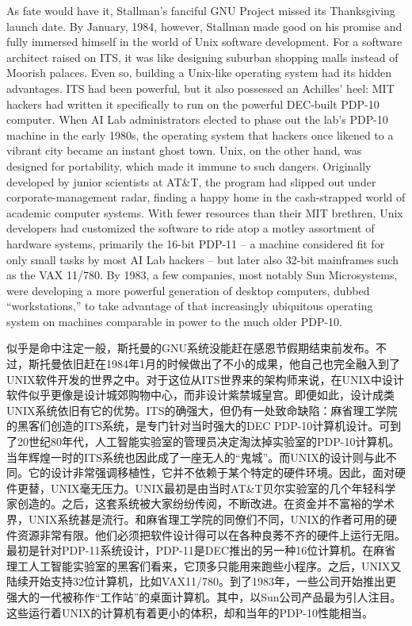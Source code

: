 As fate would have it, Stallman's fanciful GNU Project missed its Thanksgiving launch date. By January, 1984, however, Stallman made good on his promise and fully immersed himself in the world of Unix software development. For a software architect raised on ITS, it was like designing suburban shopping malls instead of Moorish palaces. Even so, building a Unix-like operating system had its hidden advantages. ITS had been powerful, but it also possessed an Achilles' heel: MIT hackers had written it specifically to run on the powerful DEC-built PDP-10 computer. When AI Lab administrators elected to phase out the lab's PDP-10 machine in the early 1980s, the operating system that hackers once likened to a vibrant city became an instant ghost town. Unix, on the other hand, was designed for portability, which made it immune to such dangers. Originally developed by junior scientists at AT\&T, the program had slipped out under corporate-management radar, finding a happy home in the cash-strapped world of academic computer systems. With fewer resources than their MIT brethren, Unix developers had customized the software to ride atop a motley assortment of hardware systems, primarily the 16-bit PDP-11 -- a machine considered fit for only small tasks by most AI Lab hackers -- but later also 32-bit mainframes such as the VAX 11/780. By 1983, a few companies, most notably Sun Microsystems, were developing a more powerful generation of desktop computers, dubbed ``workstations,'' to take advantage of that increasingly ubiquitous operating system on machines comparable in power to the much older PDP-10.
\fi
\fi

\ifdefined\chs
似乎是命中注定一般，斯托曼的GNU系统没能赶在感恩节假期结束前发布。不过，斯托曼依旧赶在1984年1月的时候做出了不小的成果，他自己也完全融入到了UNIX软件开发的世界之中。对于这位从ITS世界来的架构师来说，在UNIX中设计软件似乎更像是设计城郊购物中心，而非设计紫禁城皇宫。即便如此，设计成类UNIX系统依旧有它的优势。ITS的确强大，但仍有一处致命缺陷：麻省理工学院的黑客们创造的ITS系统，是专门针对当时强大的DEC PDP-10计算机设计。可到了20世纪80年代，人工智能实验室的管理员决定淘汰掉实验室的PDP-10计算机。当年辉煌一时的ITS系统也因此成了一座无人的``鬼城''。而UNIX的设计则与此不同。它的设计非常强调移植性，它并不依赖于某个特定的硬件环境。因此，面对硬件更替，UNIX毫无压力。UNIX最初是由当时AT\&T贝尔实验室的几个年轻科学家创造的。之后，这套系统被大家纷纷传阅，不断改进。在资金并不富裕的学术界，UNIX系统甚是流行。和麻省理工学院的同僚们不同，UNIX的作者可用的硬件资源非常有限。他们必须把软件设计得可以在各种良莠不齐的硬件上运行无阻。最初是针对PDP-11系统设计，PDP-11是DEC推出的另一种16位计算机。在麻省理工人工智能实验室的黑客们看来，它顶多只能用来跑些小程序。之后，UNIX又陆续开始支持32位计算机，比如VAX11/780。到了1983年，一些公司开始推出更强大的一代被称作``工作站''的桌面计算机。其中，以Sun公司产品最为引人注目。这些运行着UNIX的计算机有着更小的体积，却和当年的PDP-10性能相当。
\fi

